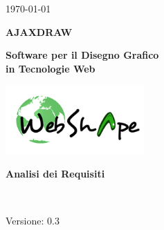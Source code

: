 \usepackage{multirow}


\renewcommand{\insertversion}{0.3} %
\renewcommand{\TITOLODOC}{Analisi dei Requisiti} %

\begin{titlepage}
\begin{center}
	\begin{Large}	\today \end{Large}
\end{center}

\vspace{20pt}

\begin{center}
	\begin{Huge}
				\textbf{AJAXDRAW}
	\end{Huge}
\end{center}			

\begin{center}
	\begin{large}
				\textbf{Software per il Disegno Grafico\\ in Tecnologie Web}
	\end{large}
\end{center}			

\vspace{20pt}

\begin{center}
\includegraphics[width=150pt]{../logo/logo}
\end{center}

\vspace{160pt}
\begin{center} %
	\begin{Huge}
				\textbf{\TITOLODOC}
	\end{Huge}
			\\
\end{center}
\vspace{220pt}
\begin{center}
Versione: \insertversion
\end{center}
\end{titlepage}

